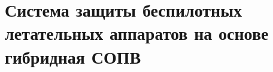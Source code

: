 
\chapter{Система защиты беспилотных летательных аппаратов на основе гибридная СОПВ}
\label{ch:uav}

